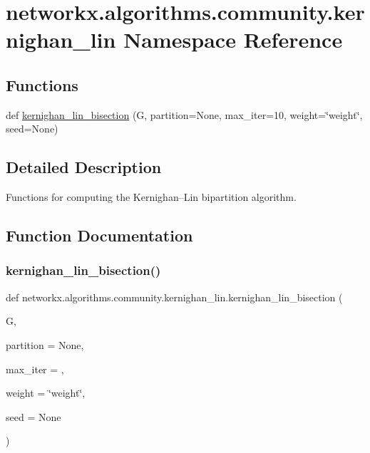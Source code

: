 \hypertarget{namespacenetworkx_1_1algorithms_1_1community_1_1kernighan__lin}{}\section{networkx.\+algorithms.\+community.\+kernighan\+\_\+lin Namespace Reference}
\label{namespacenetworkx_1_1algorithms_1_1community_1_1kernighan__lin}
\subsection*{Functions}
\begin{DoxyCompactItemize}
\item 
def \hyperlink{namespacenetworkx_1_1algorithms_1_1community_1_1kernighan__lin_a3d0f9f66102c88c7edc28024525d2946}{kernighan\+\_\+lin\+\_\+bisection} (G, partition=None, max\+\_\+iter=10, weight=\char`\"{}weight\char`\"{}, seed=None)
\end{DoxyCompactItemize}


\subsection{Detailed Description}
\begin{DoxyVerb}Functions for computing the Kernighan–Lin bipartition algorithm.\end{DoxyVerb}
 

\subsection{Function Documentation}
\mbox{\label{namespacenetworkx_1_1algorithms_1_1community_1_1kernighan__lin_a3d0f9f66102c88c7edc28024525d2946}} 
\subsubsection{\texorpdfstring{kernighan\+\_\+lin\+\_\+bisection()}{kernighan\_lin\_bisection()}}
{\footnotesize\ttfamily def networkx.\+algorithms.\+community.\+kernighan\+\_\+lin.\+kernighan\+\_\+lin\+\_\+bisection (\begin{DoxyParamCaption}\item[{}]{G,  }\item[{}]{partition = {\ttfamily None},  }\item[{}]{max\+\_\+iter = {},  }\item[{}]{weight = {\ttfamily \char`\"{}weight\char`\"{}},  }\item[{}]{seed = {\ttfamily None} }\end{DoxyParamCaption})}

